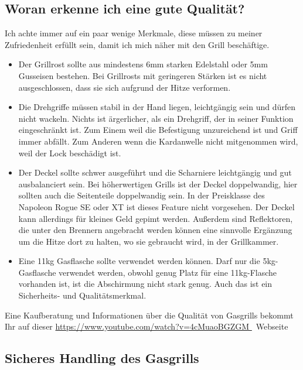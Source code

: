 \subsection{Woran erkenne ich eine gute Qualität?}

	Ich achte immer auf ein paar wenige Merkmale, diese müssen zu meiner 
	Zufriedenheit erfüllt sein, damit ich mich näher mit den Grill beschäftige. 

	\begin{itemize}[noitemsep]
		\item Der Grillrost sollte aus mindestens 6mm starken Edelstahl oder 
	    5mm Gusseisen bestehen. Bei Grillrosts mit 
		geringeren Stärken
		ist es nicht ausgeschlossen, dass sie sich aufgrund der Hitze verformen.
		\item Die Drehgriffe müssen stabil in der Hand liegen, leichtgängig sein und 
		dürfen nicht wackeln. Nichts ist ärgerlicher, als ein Drehgriff, der 
		in seiner Funktion eingeschränkt ist.
		Zum Einem weil die Befestigung unzureichend ist und Griff immer abfällt. 
		Zum Anderen wenn die Kardanwelle nicht mitgenommen wird, weil 
		der Lock beschädigt ist.
		\item Der Deckel sollte schwer ausgeführt und die Scharniere leichtgängig 
		und gut ausbalanciert sein. Bei höherwertigen Grills ist der 
		Deckel doppelwandig, hier sollten auch die
		Seitenteile doppelwandig sein. In der Preisklasse des Napoleon Rogue SE 
		oder XT ist dieses Feature nicht vorgesehen. Der Deckel kann 
		allerdings für kleines Geld gepimt werden. Außerdem sind Reflektoren, die 
		unter den Brennern angebracht werden können eine sinnvolle Ergänzung 
		um die Hitze dort zu halten, wo sie gebraucht wird, in der Grillkammer.
		\item Eine 11kg Gasflasche sollte verwendet werden können. Darf nur die 
		5kg-Gasflasche verwendet werden, obwohl genug Platz für eine 
		11kg-Flasche vorhanden ist,
		ist die Abschirmung nicht stark genug. Auch das ist ein Sicherheits- und 
		Qualitätsmerkmal.
	\end{itemize}

	Eine Kaufberatung und Informationen über die Qualität von Gasgrills bekommt 
	Ihr auf dieser 
	\url{https://www.youtube.com/watch?v=4cMuaoBGZGM }\ {Webseite}

\subsection{Sicheres Handling des Gasgrills} 

